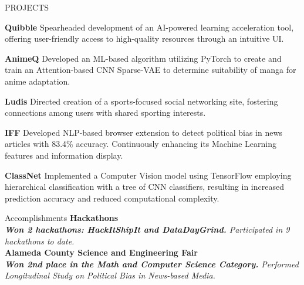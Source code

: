\documentclass{resume} %
\begin{document}
\begin{rSection}{PROJECTS}
\vspace{-1em}

\item \textbf{Quibble} {Spearheaded development of an AI-powered learning acceleration tool, offering user-friendly access to high-quality resources through an intuitive UI.}
\vspace{-1.75mm}

\item \textbf{AnimeQ} {Developed an ML-based algorithm utilizing PyTorch to create and train an Attention-based CNN Sparse-VAE to determine suitability of manga for anime adaptation.}
\vspace{-1.75mm}

\item \textbf{Ludis} {Directed creation of a sports-focused social networking site, fostering connections among users with shared sporting interests.}
\vspace{-1.75mm}

\item \textbf{IFF} {Developed NLP-based browser extension to detect political bias in news articles with 83.4\% accuracy. Continuously enhancing its Machine Learning features and information display.}
\vspace{-1.75mm}

\item \textbf{ClassNet} {Implemented a Computer Vision model using TensorFlow employing hierarchical classification with a tree of CNN classifiers, resulting in increased prediction accuracy and reduced computational complexity.}
\end{rSection} 


\begin{rSection}{Accomplishments} 
\textbf{Hackathons}\\
\textit{\textbf{Won 2 hackathons: HackItShipIt and DataDayGrind.} Participated in 9 hackathons to date. } \\
\textbf{Alameda County Science and Engineering Fair}\\
\textit{\textbf{Won 2nd place in the Math and Computer Science Category.} Performed Longitudinal Study on Political Bias in News-based Media.}

\end{rSection}
\end{document}
